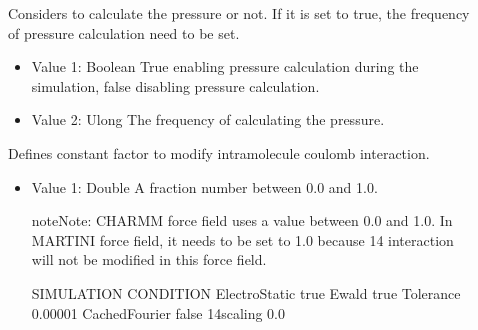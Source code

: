 \documentclass[letterpaper,10pt,english]{sphinxmanual}
\begin{document}
\begin{description}
\item[{}] \leavevmode
\sphinxAtStartPar
Considers to calculate the pressure or not. If it is set to true, the frequency of pressure calculation need to be set.
\begin{itemize}
\item {} 
\sphinxAtStartPar
Value 1: Boolean \sphinxhyphen{} True enabling pressure calculation during the simulation, false disabling pressure calculation.

\item {} 
\sphinxAtStartPar
Value 2: Ulong \sphinxhyphen{} The frequency of calculating the pressure.

\end{itemize}

\item[{}] \leavevmode
\sphinxAtStartPar
Defines constant factor to modify intra\sphinxhyphen{}molecule coulomb interaction.
\begin{itemize}
\item {} 
\sphinxAtStartPar
Value 1: Double \sphinxhyphen{} A fraction number between 0.0 and 1.0.

\begin{sphinxadmonition}{note}{Note:}
\sphinxAtStartPar
CHARMM force field uses a value between 0.0 and 1.0. In MARTINI force field, it needs to be set to 1.0 because 1\sphinxhyphen{}4 interaction will not be modified in this force field.
\end{sphinxadmonition}

\begin{sphinxVerbatim}[commandchars=\\\{\}]
\PYGZsh{}\PYGZsh{}\PYGZsh{}\PYGZsh{}\PYGZsh{}\PYGZsh{}\PYGZsh{}\PYGZsh{}\PYGZsh{}\PYGZsh{}\PYGZsh{}\PYGZsh{}\PYGZsh{}\PYGZsh{}\PYGZsh{}\PYGZsh{}\PYGZsh{}\PYGZsh{}\PYGZsh{}\PYGZsh{}\PYGZsh{}\PYGZsh{}\PYGZsh{}\PYGZsh{}\PYGZsh{}\PYGZsh{}\PYGZsh{}\PYGZsh{}\PYGZsh{}\PYGZsh{}\PYGZsh{}\PYGZsh{}\PYGZsh{}
\PYGZsh{} SIMULATION CONDITION
\PYGZsh{}\PYGZsh{}\PYGZsh{}\PYGZsh{}\PYGZsh{}\PYGZsh{}\PYGZsh{}\PYGZsh{}\PYGZsh{}\PYGZsh{}\PYGZsh{}\PYGZsh{}\PYGZsh{}\PYGZsh{}\PYGZsh{}\PYGZsh{}\PYGZsh{}\PYGZsh{}\PYGZsh{}\PYGZsh{}\PYGZsh{}\PYGZsh{}\PYGZsh{}\PYGZsh{}\PYGZsh{}\PYGZsh{}\PYGZsh{}\PYGZsh{}\PYGZsh{}\PYGZsh{}\PYGZsh{}\PYGZsh{}\PYGZsh{}
ElectroStatic   true
Ewald           true
Tolerance       0.00001
CachedFourier   false
1\PYGZhy{}4scaling      0.0
\end{sphinxVerbatim}


\end{itemize}
\end{description}
\end{document}

